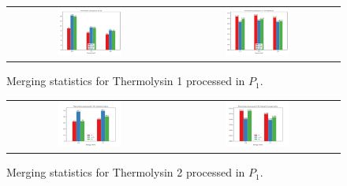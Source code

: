 \begin{figure}[h]
    \centering
    \begin{tabular}{cc}
    \includegraphics[width = 0.4\textwidth]{plots/exp1/tlys_9_P1/I_over_sigma.png} & \includegraphics[width = 0.4\textwidth]{plots/exp1/tlys_9_P1/rmerges.png}
    \end{tabular}
    \caption{Merging statistics for Thermolysin 1 processed in $P_1$.}
    \label{fig:tlys_9_p1}
\end{figure}

\begin{figure}[H]
    \centering
    \begin{tabular}{cc}
    \includegraphics[width = 0.4\textwidth]{plots/exp1/tlys_2_P1/I_over_sigma.png} & \includegraphics[width = 0.4\textwidth]{plots/exp1/tlys_2_P1/rmerges.png}
    \end{tabular}
    \caption{Merging statistics for Thermolysin 2 processed in $P_1$.}
    \label{fig:tlys_2_p1}
\end{figure}


